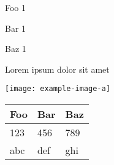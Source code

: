 \documentclass{article}
\begin{document}
\begin{gridlayout}[\textwidth]
    \begin{row}{4cm}
        \begin{cell}{0.2}
            Foo 1
        \end{cell}
        \begin{cell}{0.4}
            Bar 1
        \end{cell}
        \begin{cell}{0.2}
            Baz 1
        \end{cell}
    \end{row}
    \begin{row}{6cm}
        \begin{cell}{0.1}
            Lorem ipsum dolor sit amet
        \end{cell}
        \begin{cell}{0.5}
            \texttt{[image: example-image-a]}
        \end{cell}
        \begin{cell}{0.4}
            \begin{tabular}{lll}
                \toprule
                Foo & Bar & Baz \\
                \midrule
                123 & 456 & 789 \\
                abc & def & ghi \\
                \bottomrule
            \end{tabular}
        \end{cell}
    \end{row}
\end{gridlayout}
\end{document}
